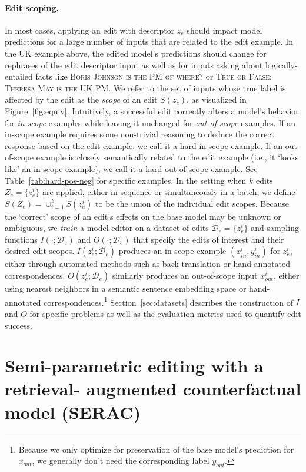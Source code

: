 \documentclass{article}
\newcommand{\fullnamevar}{Semi-parametric editing with a retrieval- augmented counterfactual model}
\newcommand{\name}{SERAC}
\newcommand{\edits}{Z_e}
\newcommand{\editdata}{\mathcal{D}_{e}}
\newcommand{\rawstring}[1]{\textsc{\footnotesize #1}}
\newcommand{\ze}[1][]{z_e^{#1}}
\newcommand{\scope}[1]{S\left(#1\right)}
\newcommand{\xloc}[1][]{x_{out}^{#1}}
\newcommand{\yloc}[1][]{y_{out}^{#1}}
\newcommand{\xtest}[1][]{x_{in}^{#1}}
\newcommand{\ytest}[1][]{y_{in}^{#1}}
\begin{document}
\paragraph{Edit scoping.} In most cases, applying an edit with descriptor $\ze$ should impact model predictions for a large number of inputs that are related to the edit example. In the UK example above, the edited model's predictions should change for rephrases of the edit descriptor input as well as for inputs asking about logically-entailed facts like \rawstring{Boris Johnson is the PM of where?} or \rawstring{True or False: Theresa May is the UK PM}. We refer to the set of inputs whose true label is affected by the edit as the \textit{scope} of an edit $\scope{\ze}$, as visualized in Figure~\ref{fig:equiv}. Intuitively, a successful edit correctly alters a model's behavior for \textit{in-scope} examples while leaving it unchanged for \textit{out-of-scope} examples. If an in-scope example requires some non-trivial reasoning to deduce the correct response based on the edit example, we call it a hard in-scope example. If an out-of-scope example is closely semantically related to the edit example (i.e., it `looks like' an in-scope example), we call it a hard out-of-scope example. See Table~\ref{tab:hard-pos-neg} for specific examples. In the setting when $k$ edits $\edits = \{\ze[i]\}$ are applied, either in sequence or simultaneously in a batch, we define $\scope{\edits} = \cup_{i=1}^k \scope{\ze[i]}$ to be the union of the individual edit scopes. Because the `correct' scope of an edit's effects on the base model may be unknown or ambiguous, we \textit{train} a model editor on a dataset of edits $\editdata =\{\ze[i]\}$ and sampling functions $I(\cdot; \editdata)$ and $O(\cdot; \editdata)$ that specify the edits of interest and their desired edit scopes. $I(\ze[i]; \editdata)$ produces an in-scope example $(\xtest[i], \ytest[i])$ for $\ze[i]$, either through automated methods such as back-translation or hand-annotated correspondences. $O(\ze[i]; \editdata)$ similarly produces an out-of-scope input $\xloc[i]$, either using nearest neighbors in a semantic sentence embedding space or hand-annotated correspondences.\footnote{Because we only optimize for preservation of the base model's prediction for $\xloc$, we generally don't need the corresponding label $\yloc$.} Section~\ref{sec:datasets} describes the construction of $I$ and $O$ for specific problems as well as the evaluation metrics used to quantify edit success.


\section{{\fullnamevar} ({\name})}
\label{sec:method}
\end{document}

